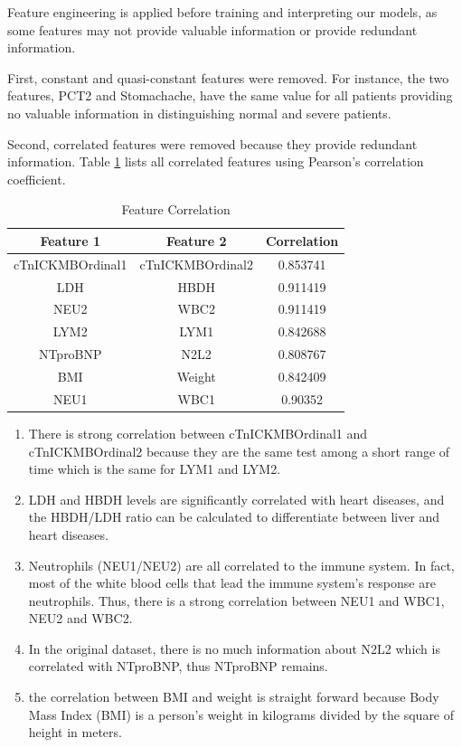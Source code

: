 Feature engineering is applied before training and interpreting our models, as some features may not provide valuable information or provide redundant information.

First, constant and quasi-constant features were removed. For instance, the two features, PCT2 and Stomachache, have the same value for all patients providing no valuable information in distinguishing normal and severe patients.


Second, correlated features were removed because they provide redundant information. Table \ref{tab:feature_correlation} lists all correlated features using Pearson’s correlation coefficient. 


\begin{table}[H]
\centering
\begin{tabular}{@{}ccc@{}}
\toprule
Feature 1    & Feature 2 & Correlation\\ \midrule
cTnICKMBOrdinal1 & cTnICKMBOrdinal2             & 0.853741       \\
LDH & HBDH             &  0.911419   \\
NEU2           & WBC2             &  0.911419  \\
LYM2       & LYM1             & 0.842688    \\ 
NTproBNP       & N2L2             & 0.808767   \\ 
BMI       & Weight             & 0.842409    \\  
NEU1       & WBC1             & 0.90352    \\  \bottomrule
\end{tabular}
\caption{Feature Correlation}
\label{tab:feature_correlation}
\end{table}


\begin{enumerate}  
\item There is strong correlation between cTnICKMBOrdinal1 and cTnICKMBOrdinal2 because they are the same test among a short range of time which is the same for LYM1 and LYM2.
\item LDH and HBDH levels are significantly correlated with heart diseases, and the HBDH/LDH ratio can be calculated to differentiate between liver and heart diseases.
\item Neutrophils (NEU1/NEU2) are all correlated to the immune system. In fact, most of the white blood cells that lead the immune system’s response are neutrophils. Thus, there is a strong correlation between NEU1 and WBC1, NEU2 and WBC2.
\item In the original dataset, there is no much information about N2L2 which is correlated with NTproBNP, thus NTproBNP remains.
\item the correlation between BMI and weight is straight forward because Body Mass Index (BMI) is a person’s weight in kilograms divided by the square of height in meters.
\end{enumerate}

